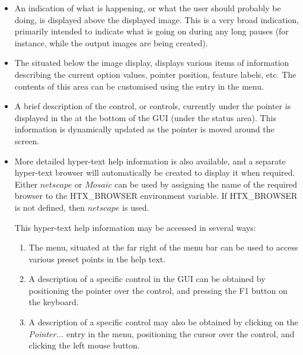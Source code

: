 \documentclass[11pt,nolof]{starlink}
\begin{document}
\begin{itemize}

\item An indication of what is happening, or what the user should
probably be doing, is displayed above the displayed image. This is a very
broad indication, primarily intended to indicate what is going on during
any long pauses (for instance, while the output images are being
created).

\item The  situated below
the image display, displays various items of information describing the
current option values, pointer position, feature labels, etc. The
contents of this area can be customised using the  entry in the  menu.

\item A brief description of the control, or controls, currently under the
pointer is displayed in the  at the
bottom of the GUI (under the status area). This information is
dynamically updated as the pointer is moved around the screen.

\item More detailed hyper-text help information is also available, and a
separate hyper-text browser will automatically be created to display it
when required. Either $netscape$ or $Mosaic$ can be used by
assigning the name of the required browser to the HTX\_BROWSER
environment variable. If HTX\_BROWSER is not defined, then $netscape$
is used.

This hyper-text help information may be accessed in several ways:

\begin{enumerate}

\item The  menu, situated at the
far right of the menu bar can be used to access various preset points in
the help text.

\item A description of a specific control in the GUI can be obtained by
positioning the pointer over the control, and pressing the F1
button on the keyboard.

\item A description of a specific control may also be obtained by clicking
on the \emph{Pointer...} entry in the  menu, positioning the cursor over the control,
and clicking the left mouse button.

\end{enumerate}

\end{itemize}
\end{document}
